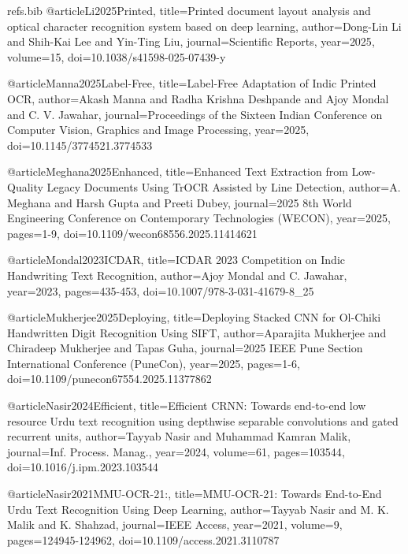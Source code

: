 \begin{filecontents}{refs.bib}
    @article{Li2025Printed,
    title={Printed document layout analysis and optical character recognition system based on deep learning},
    author={Dong-Lin Li and Shih-Kai Lee and Yin-Ting Liu},
    journal={Scientific Reports},
    year={2025},
    volume={15},
    doi={10.1038/s41598-025-07439-y}
    }
    
    @article{Manna2025Label-Free,
    title={Label-Free Adaptation of Indic Printed OCR},
    author={Akash Manna and Radha Krishna Deshpande and Ajoy Mondal and C. V. Jawahar},
    journal={Proceedings of the Sixteen Indian Conference on Computer Vision, Graphics and Image Processing},
    year={2025},
    doi={10.1145/3774521.3774533}
    }
    
    @article{Meghana2025Enhanced,
    title={Enhanced Text Extraction from Low-Quality Legacy Documents Using TrOCR Assisted by Line Detection},
    author={A. Meghana and Harsh Gupta and Preeti Dubey},
    journal={2025 8th World Engineering Conference on Contemporary Technologies (WECON)},
    year={2025},
    pages={1-9},
    doi={10.1109/wecon68556.2025.11414621}
    }
    
    @article{Mondal2023ICDAR,
    title={ICDAR 2023 Competition on Indic Handwriting Text Recognition},
    author={Ajoy Mondal and C. Jawahar},
    year={2023},
    pages={435-453},
    doi={10.1007/978-3-031-41679-8_25}
    }
    
    @article{Mukherjee2025Deploying,
    title={Deploying Stacked CNN for Ol-Chiki Handwritten Digit Recognition Using SIFT},
    author={Aparajita Mukherjee and Chiradeep Mukherjee and Tapas Guha},
    journal={2025 IEEE Pune Section International Conference (PuneCon)},
    year={2025},
    pages={1-6},
    doi={10.1109/punecon67554.2025.11377862}
    }
    
    @article{Nasir2024Efficient,
    title={Efficient CRNN: Towards end-to-end low resource Urdu text recognition using depthwise separable convolutions and gated recurrent units},
    author={Tayyab Nasir and Muhammad Kamran Malik},
    journal={Inf. Process. Manag.},
    year={2024},
    volume={61},
    pages={103544},
    doi={10.1016/j.ipm.2023.103544}
    }
    
    @article{Nasir2021MMU-OCR-21:,
    title={MMU-OCR-21: Towards End-to-End Urdu Text Recognition Using Deep Learning},
    author={Tayyab Nasir and M. K. Malik and K. Shahzad},
    journal={IEEE Access},
    year={2021},
    volume={9},
    pages={124945-124962},
    doi={10.1109/access.2021.3110787}
    }
    

\end{filecontents}
